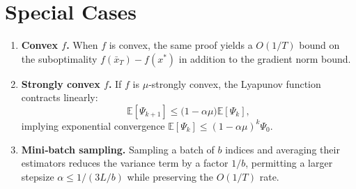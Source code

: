 \documentclass{article}
\newcommand{\E}{\mathbb{E}}
\begin{document}
\section*{Special Cases}
\begin{enumerate}[label=\alph*.]
\item \textbf{Convex $f$.}  When $f$ is convex, the same proof yields a
$O(1/T)$ bound on the suboptimality $f(\bar x_T)-f(x^{*})$ in addition to the
gradient norm bound.
\item \textbf{Strongly convex $f$.}  If $f$ is $\mu$‑strongly convex,
the Lyapunov function contracts linearly:
\[
\E[\Psi_{k+1}]\le\bigl(1-\alpha\mu\bigr)\E[\Psi_k],
\]
implying exponential convergence $\E[\Psi_k]\le (1-\alpha\mu)^{k}\Psi_0$.
\item \textbf{Mini‑batch sampling.}  Sampling a batch of $b$ indices and averaging
their estimators reduces the variance term by a factor $1/b$, permitting a
larger stepsize $\alpha\le 1/(3L/b)$ while preserving the $O(1/T)$ rate.
\end{enumerate}
\end{document}
